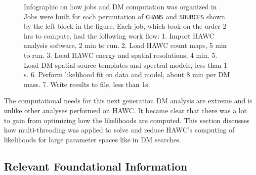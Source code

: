 \begin{figure}[h]
    \caption{Infographic on how jobs and DM computation was organized in . Jobs were built for each permutation of \texttt{CHANS} and \texttt{SOURCES} shown by the left block in the figure. Each job, which took on the order 2 hrs to compute, had the following work flow: 1. Import HAWC analysis software, 2 min to run. 2. Load HAWC count maps, 5 min to run. 3. Load HAWC energy and spatial resolutions, 4 min. 5. Load DM spatial source templates and spectral models, less than 1 s. 6. Perform likelihood fit on data and model, about 8 min per DM mass. 7. Write results to file, less than 1s.}
    \label{fig:mtd_gd_workflow}
\end{figure}

The computational needs for this next generation DM analysis are extreme and is unlike other analyses performed on HAWC.
It became clear that there was a lot to gain from optimizing how the likelihoods are computed.
This section discusses how multi-threading was applied to solve and reduce HAWC's computing of likelihoods for large parameter spaces like in DM searches.

\subsection{Relevant Foundational Information}\label{sec:mtd_foundation}

